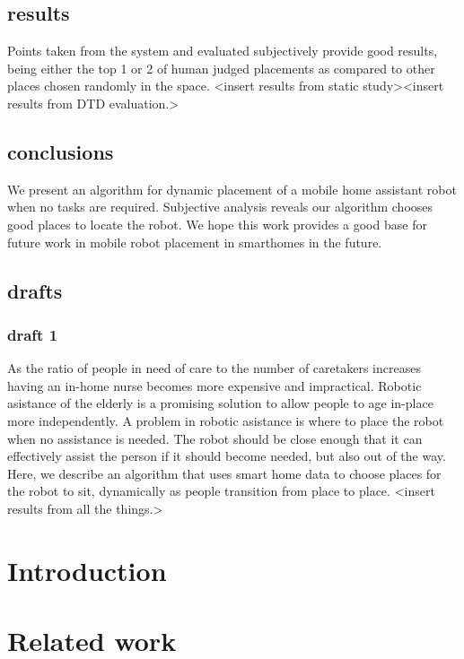 \documentclass[12pt,a4paper]{article}
\begin{document}
\subsection{results}
Points taken from the system and evaluated subjectively provide good results, being either the top 1 or 2 of human judged placements as compared to other places chosen randomly in the space. \textless insert results from static study\textgreater \textless insert results from DTD evaluation.\textgreater

\subsection{conclusions}
We present an algorithm for dynamic placement of a mobile home assistant robot when no tasks are required. Subjective analysis reveals our algorithm chooses good places to locate the robot. We hope this work provides a good base for future work in mobile robot placement in smarthomes in the future.

\subsection{drafts}
\subsubsection{draft 1}
As the ratio of people in need of care to the number of caretakers increases having an in-home nurse becomes more expensive and impractical. Robotic asistance of the elderly is a promising solution to allow people to age in-place more independently. A problem in robotic asistance is where to place the robot when no assistance is needed. The robot should be close enough that it can effectively assist the person if it should become needed, but also out of the way. Here, we describe an algorithm that uses smart home data to choose places for the robot to sit, dynamically as people transition from place to place. \textless insert results from all the things.\textgreater


\section{Introduction}

\section{Related work}
\end{document}

